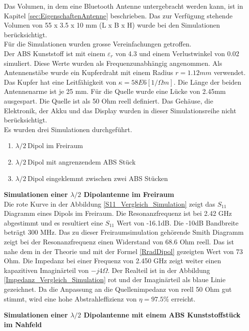 Das Volumen, in dem eine Bluetooth Antenne untergebracht werden kann, ist in Kapitel \ref{sec:EigenschaftenAntenne} beschrieben. Das zur Verfügung stehende Volumen von 55 x 3.5 x 10 mm (L x B x H) wurde bei den Simulationen berücksichtigt. \\
Für die Simulationen wurden grosse Vereinfachungen getroffen.\\
Der ABS Kunststoff ist mit einem $\varepsilon_r $ von 4.3 und einem Verlustwinkel von 0.02 simuliert. Diese Werte wurden als Frequenzunabhängig angenommen. Als Antennenstäbe wurde ein Kupferdraht mit einem Radius $r = 1.12 mm$ verwendet. Das Kupfer hat eine Leitfähigkeit von $\kappa=58E6 [1/\Omega m]$. Die Länge der beiden Antennenarme ist je 25 mm. Für die Quelle wurde eine Lücke von 2.45mm ausgespart. Die Quelle ist als 50 Ohm reell definiert. Das Gehäuse, die Elektronik, der Akku und das Display wurden in dieser Simulationsreihe nicht berücksichtigt.\\ 
Es wurden drei Simulationen durchgeführt.
\begin{enumerate}
\item $\lambda/2 \ $Dipol im Freiraum
\item $\lambda/2 \ $Dipol mit angrenzendem ABS Stück
\item $\lambda/2 \ $Dipol eingeklemmt zwischen zwei ABS Stücken
\end{enumerate}

\textbf{Simulationen einer $\lambda/2$ Dipolantenne im Freiraum}\\
Die rote Kurve in der Abbildung \ref{S11_Vergleich_Simulation} zeigt das $S_{11}$ Diagramm eines Dipols im Freiraum. Die Resonanzfrequenz ist bei 2.42 GHz abgestimmt und es resultiert eine $S_{11}$ Wert von -16.1dB. Die -10dB Bandbreite beträgt 300 MHz. Das zu dieser Freiraumsimulation gehörende Smith Diagramm zeigt bei der Resonanzfrequenz einen Widerstand von 68.6 Ohm reell. Das ist nahe dem in der Theorie und mit der Formel \ref{RradDipol} gezeigten Wert von 73 Ohm. Die Impedanz bei einer Frequenz von 2.450 GHz zeigt weiter einen kapazitiven Imaginärteil von $-j4\Omega$. Der Realteil ist in der Abbildung \ref{Impedanz_Vergleich_Simulation} rot und der Imaginärteil als blaue Linie gezeichnet. Da die Anpassung an die Quellenimpedanz von reell 50 Ohm gut stimmt, wird eine hohe Abstrahleffizienz von $\eta = 97.5 \% $ erreicht.


\textbf{Simulationen einer $\lambda/2$ Dipolantenne mit einem ABS Kunststoffstück im Nahfeld}\\

